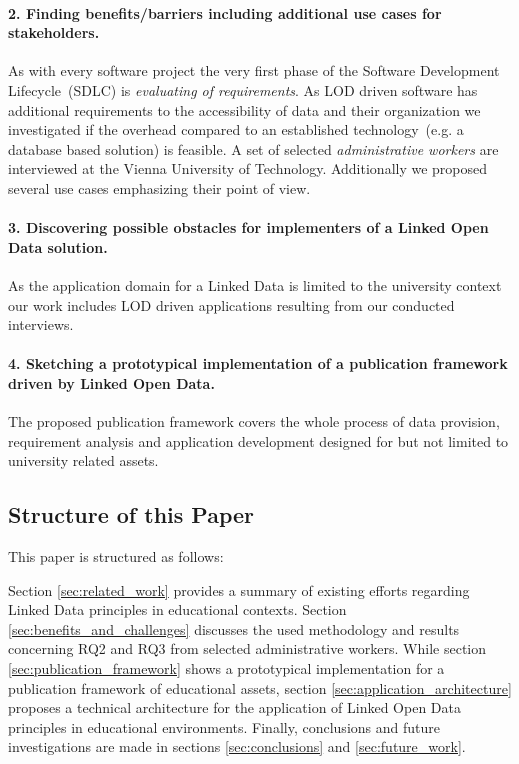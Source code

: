 \documentclass{article}
\begin{document}
\paragraph{2. Finding benefits/barriers including additional use cases for stakeholders.}
As with every software project the very first phase of the Software Development Lifecycle~(SDLC) is \textit{evaluating of requirements}. As LOD driven software has additional requirements to the accessibility of data and their organization we investigated if the overhead compared to an established technology~(e.g. a database based solution) is feasible. A set of selected \textit{administrative workers} are interviewed at the Vienna University of Technology. Additionally we proposed several use cases emphasizing their point of view. 
\paragraph{3. Discovering possible obstacles for implementers of a Linked Open Data solution.}
As the application domain for a Linked Data is limited to the university context our work includes LOD driven applications resulting from our conducted interviews.
\paragraph{4. Sketching a prototypical implementation of a publication framework driven by Linked Open Data.}
The proposed publication framework covers the whole process of data provision, requirement analysis and application development designed for but not limited to university related assets.  
\subsection{Structure of this Paper}
This paper is structured as follows:

Section \ref{sec:related_work} provides a summary
of existing efforts regarding Linked Data principles in educational contexts. Section \ref{sec:benefits_and_challenges}
discusses the used methodology and results 
concerning RQ2 and RQ3 from selected administrative workers.
While section \ref{sec:publication_framework} shows a prototypical implementation for a publication framework of educational assets,
section \ref{sec:application_architecture} proposes a technical architecture for the application of Linked Open
Data principles in educational environments.
Finally, conclusions and future investigations are made in sections \ref{sec:conclusions} and \ref{sec:future_work}.
\end{document}
